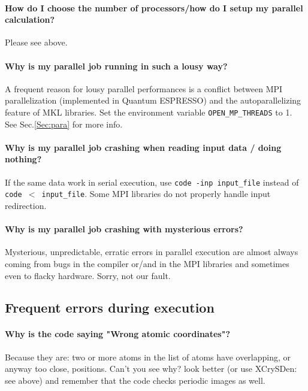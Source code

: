 \documentclass[12pt,a4paper]{article}
\def\qe{{\sc Quantum ESPRESSO}}
\begin{document}
\paragraph{How do I choose the number of processors/how do I setup my parallel calculation?}

Please see above.

\paragraph{Why is my parallel job running in such a lousy way?}

A frequent reason for lousy parallel performances is a
conflict between MPI parallelization (implemented in \qe)
and the autoparallelizing feature of MKL libraries. Set the
environment variable \texttt{OPEN\_MP\_THREADS} to 1. 
See Sec.\ref{Sec:para} for more info.

\paragraph{Why is my parallel job crashing when reading input data / doing nothing?}

If the same data work in serial execution, use
\texttt{code -inp input\_file} instead of \texttt{code $<$ input\_file}. 
Some MPI libraries do not properly handle input redirection.

\paragraph{Why is my parallel job crashing with mysterious errors?}

Mysterious, unpredictable, erratic errors in parallel execution are
almost always coming from bugs in the compiler or/and in the MPI 
libraries and sometimes even to flacky hardware. Sorry, not our fault.

\subsection{Frequent errors during execution}

\paragraph{Why is the code saying "Wrong atomic coordinates"?}

Because they are: two or more atoms in the list of atoms have
overlapping, or anyway too close, positions. Can't you see why? look better
(or use XCrySDen: see above) and remember that the code checks periodic
images as well. 
\end{document}
